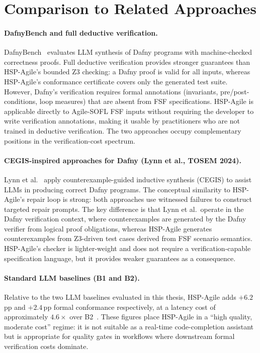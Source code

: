\section{Comparison to Related Approaches}
\label{sec:disc:related}

\paragraph{DafnyBench and full deductive verification.}
DafnyBench~\citep{loughman2024dafnybench} evaluates LLM synthesis of Dafny programs with machine-checked
correctness proofs.  Full deductive verification provides stronger guarantees than
HSP-Agile's bounded Z3 checking: a Dafny proof is valid for all inputs, whereas
HSP-Agile's conformance certificate covers only the generated test suite.  However,
Dafny's verification requires formal annotations (invariants, pre/post-conditions, loop
measures) that are absent from FSF specifications.  HSP-Agile is applicable directly to
Agile-SOFL FSF inputs without requiring the developer to write verification annotations,
making it usable by practitioners who are not trained in deductive verification.  The two
approaches occupy complementary positions in the verification-cost spectrum.

\paragraph{CEGIS-inspired approaches for Dafny (Lynn et al., TOSEM 2024).}
Lynn et al.~\citep{lynn2024verifierloop} apply counterexample-guided inductive synthesis (CEGIS)
to assist LLMs in producing correct Dafny programs.  The conceptual similarity to
HSP-Agile's repair loop is strong: both approaches use witnessed failures to construct
targeted repair prompts.  The key difference is that Lynn et al.\ operate in the Dafny
verification context, where counterexamples are generated by the Dafny verifier from
logical proof obligations, whereas HSP-Agile generates counterexamples from Z3-driven test
cases derived from FSF scenario semantics.  HSP-Agile's checker is lighter-weight and does
not require a verification-capable specification language, but it provides weaker
guarantees as a consequence.

\paragraph{Standard LLM baselines (B1 and B2).}
Relative to the two LLM baselines evaluated in this thesis, HSP-Agile adds
$+6.2$\,pp and $+2.4$\,pp formal conformance respectively, at a latency cost of
approximately $4.6\times$ over B2~\citep{dakhel2023copilot,chen2021codex}.  These figures place HSP-Agile in a ``high quality,
moderate cost'' regime: it is not suitable as a real-time code-completion assistant but is
appropriate for quality gates in workflows where downstream formal verification costs
dominate.
